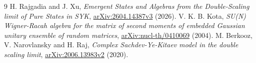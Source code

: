 \documentclass[11pt]{article}
\begin{document}
\begin{thebibliography}{9}
 H. Rajgadia and J. Xu,
\emph{Emergent States and Algebras from the Double-Scaling limit of
Pure States in SYK},
\href{https://arxiv.org/abs/2604.14387v3}{arXiv:2604.14387v3} (2026).
 V. K. B. Kota,
\emph{SU(N) Wigner-Racah algebra for the matrix of second moments of
embedded Gaussian unitary ensemble of random matrices},
\href{https://arxiv.org/abs/nucl-th/0410069}{arXiv:nucl-th/0410069} (2004).
 M. Berkooz, V. Narovlansky and H. Raj,
\emph{Complex Sachdev-Ye-Kitaev model in the double scaling limit},
\href{https://arxiv.org/abs/2006.13983v2}{arXiv:2006.13983v2} (2020).
\end{thebibliography}
\end{document}
